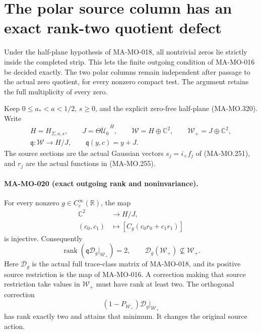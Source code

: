 \section{The polar source column has an exact rank-two quotient defect}
\label{sec:polar-quotient-rank}

Under the half-plane hypothesis of MA-MO-018, all nontrivial
zeros lie strictly inside the completed strip. This lets the
finite outgoing condition of MA-MO-016 be decided exactly.
The two polar columns remain independent after passage to the
actual zero quotient, for every nonzero compact test. The
argument retains the full multiplicity of every zero.

Keep \(0\le a_*<a<1/2\), \(s\ge0\), and the explicit
zero-free half-plane (MA-MO.320). Write
\[
 \begin{gathered}
 H=H_{\Sigma,a,s},\qquad J=\overline{\Theta\mathscr U_0}^{\,H},
 \qquad\mathcal W=H\oplus\mathbb C^2,
 \qquad\mathcal W_+=J\oplus\mathbb C^2,\\
 \mathfrak q:\mathcal W\longrightarrow H/J,
                    \qquad\mathfrak q(y,c)=y+J.
 \end{gathered}
 \tag{MA-MO.400}
\]
The source sections are the actual Gaussian vectors
\(s_j=i_+f_j\) of (MA-MO.251), and \(r_j\) are the
actual functions in (MA-MO.255).

\paragraph{MA-MO-020 (exact outgoing rank and noninvariance).}
For every nonzero \(g\in C_c^\infty(\mathbb R)\), the
map
\[
 \begin{aligned}
 \mathbb C^2&\longrightarrow H/J,\\
 (c_0,c_1)&\longmapsto[C_g(c_0r_0+c_1r_1)]
 \end{aligned}
 \tag{MA-MO.401}
\]
is injective. Consequently
\[
        \operatorname{rank}
         (\mathfrak q\mathscr D_g|_{\mathcal W_+})=2,
                \qquad
        \mathscr D_g(\mathcal W_+)\not\subseteq\mathcal W_+.
 \tag{MA-MO.402}
\]
Here \(\mathscr D_g\) is the actual full trace-class matrix
of MA-MO-018, and its positive source restriction is the map
of MA-MO-016. A correction making that source restriction
take values in \(\mathcal W_+\) must have rank at least two.
The orthogonal correction
\[
       (1-P_{\mathcal W_+})
                        \mathscr D_g|_{\mathcal W_+}
 \tag{MA-MO.403}
\]
has rank exactly two and attains that minimum. It changes
the original source action.

